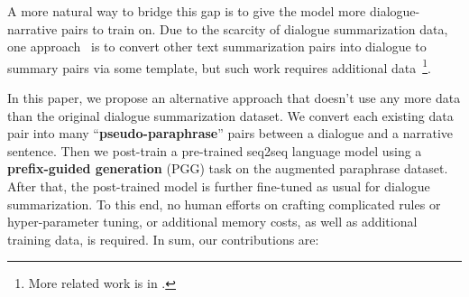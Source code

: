 A more natural way to bridge this gap is to give the model 
more dialogue-narrative pairs to train on. Due to the scarcity of dialogue
summarization data, one approach~\cite{zhu2020hierarchical} is 
to convert other text summarization
pairs into dialogue to summary pairs via some template, but such work
requires additional data~\footnote{More related work is in .}.

In this paper, we propose an alternative approach that 
doesn't use any more data than the original dialogue summarization dataset. 
We convert each existing data pair into many ``\textbf{pseudo-paraphrase}'' pairs 
between a dialogue and a narrative sentence. Then we post-train a pre-trained
seq2seq language model using a \textbf{prefix-guided generation} (PGG) task 
on the augmented paraphrase dataset.
After that, the post-trained model is further fine-tuned as usual 
for dialogue summarization. 
To this end, no human efforts on crafting complicated 
rules or hyper-parameter tuning, or additional memory 
costs, as well as additional training data, is required.
In sum, our contributions are:



